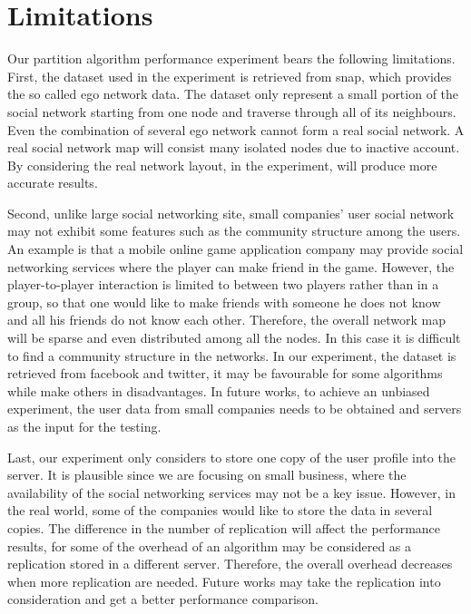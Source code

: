 \section{Limitations}

Our partition algorithm performance experiment bears the following limitations.
First, the dataset used in the experiment is retrieved from snap, which provides the so called ego network data. The dataset only represent a small portion of the social network starting from one node and traverse through all of its neighbours. Even the combination of several ego network cannot form a real social network. A real social network map will consist many isolated nodes due to inactive account. By considering the real network layout, in the experiment, will produce more accurate results. 

Second, unlike large social networking site, small companies’ user social network may not exhibit some features such as the community structure among the users. An example is that a mobile online game application company may provide social networking services where the player can make friend in the game. However, the player-to-player interaction is limited to between two players rather than in a group, so that one would like to make friends with someone he does not know and all his friends do not know each other. Therefore, the overall network map will be sparse and even distributed among all the nodes. In this case it is difficult to find a community structure in the networks. In our experiment, the dataset is retrieved from facebook and twitter, it may be favourable for some algorithms while make others in disadvantages. In future works, to achieve an unbiased experiment, the user data from small companies needs to be obtained and servers as the input for the testing.

Last, our experiment only considers to store one copy of the user profile into the server.  It is plausible since we are focusing on small business, where the availability of the social networking services may not be a key issue. However, in the real world, some of the companies would like to store the data in several copies. The difference in the number of replication will affect the performance results, for some of the overhead of an algorithm may be considered as a replication stored in a different server. Therefore, the overall overhead decreases when more replication are needed. Future works may take the replication into consideration and get a better performance comparison. 